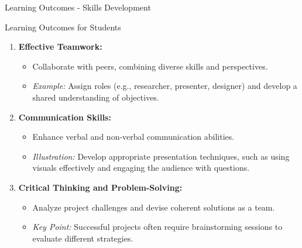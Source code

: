 \documentclass[aspectratio=169]{beamer}
\begin{document}
\begin{frame}[fragile]{Learning Outcomes - Skills Development}
    \begin{block}{Learning Outcomes for Students}
        \begin{enumerate}
            \item \textbf{Effective Teamwork:}
            \begin{itemize}
                \item Collaborate with peers, combining diverse skills and perspectives.
                \item \textit{Example:} Assign roles (e.g., researcher, presenter, designer) and develop a shared understanding of objectives.
            \end{itemize}
            
            \item \textbf{Communication Skills:}
            \begin{itemize}
                \item Enhance verbal and non-verbal communication abilities.
                \item \textit{Illustration:} Develop appropriate presentation techniques, such as using visuals effectively and engaging the audience with questions.
            \end{itemize}
            
            \item \textbf{Critical Thinking and Problem-Solving:}
            \begin{itemize}
                \item Analyze project challenges and devise coherent solutions as a team.
                \item \textit{Key Point:} Successful projects often require brainstorming sessions to evaluate different strategies.
            \end{itemize}
        \end{enumerate}
    \end{block}
\end{frame}
\end{document}

